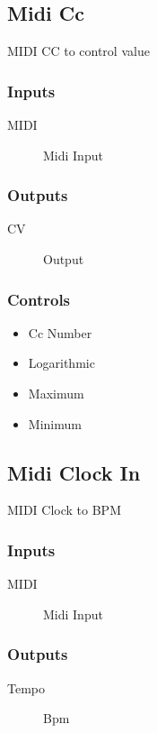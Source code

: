 \subsection{Midi Cc}

MIDI CC to control value



\subsubsection{Inputs}
\begin{description}
\item [MIDI] Midi Input
\end{description}

\subsubsection{Outputs}
\begin{description}
\item [CV] Output
\end{description}

\subsubsection{Controls}
\begin{itemize}
\item Cc Number
\item Logarithmic
\item Maximum
\item Minimum
\end{itemize}

\subsection{Midi Clock In}

MIDI Clock to BPM



\subsubsection{Inputs}
\begin{description}
\item [MIDI] Midi Input
\end{description}

\subsubsection{Outputs}
\begin{description}
\item [Tempo] Bpm
\end{description}

